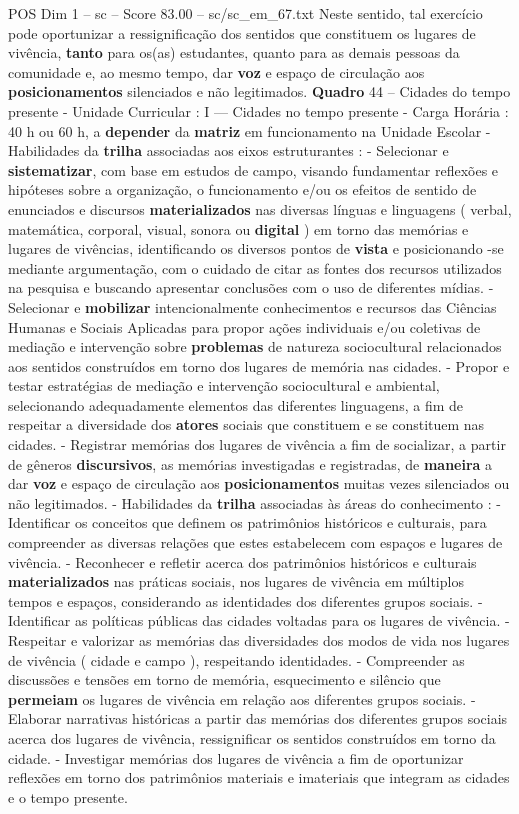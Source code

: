\begin{textsample}{POS Dim 1 – sc – Score 83.00 – sc/sc\_em\_67.txt}
Neste sentido, tal exercício pode oportunizar a ressignificação dos sentidos que constituem os lugares de vivência, \textbf{tanto} para os(as) estudantes, quanto para as demais pessoas da comunidade e, ao mesmo tempo, dar \textbf{voz} e espaço de circulação aos \textbf{posicionamentos} silenciados e não legitimados. \textbf{Quadro} 44 – Cidades do tempo presente - Unidade Curricular : I — Cidades no tempo presente - Carga Horária : 40 h ou 60 h, a \textbf{depender} da \textbf{matriz} em funcionamento na Unidade Escolar - Habilidades da \textbf{trilha} associadas aos eixos estruturantes : - Selecionar e \textbf{sistematizar}, com base em estudos de campo, visando fundamentar reflexões e hipóteses sobre a organização, o funcionamento e/ou os efeitos de sentido de enunciados e discursos \textbf{materializados} nas diversas línguas e linguagens ( verbal, matemática, corporal, visual, sonora ou \textbf{digital} ) em torno das memórias e lugares de vivências, identificando os diversos pontos de \textbf{vista} e posicionando -se mediante argumentação, com o cuidado de citar as fontes dos recursos utilizados na pesquisa e buscando apresentar conclusões com o uso de diferentes mídias. - Selecionar e \textbf{mobilizar} intencionalmente conhecimentos e recursos das Ciências Humanas e Sociais Aplicadas para propor ações individuais e/ou coletivas de mediação e intervenção sobre \textbf{problemas} de natureza sociocultural relacionados aos sentidos construídos em torno dos lugares de memória nas cidades. - Propor e testar estratégias de mediação e intervenção sociocultural e ambiental, selecionando adequadamente elementos das diferentes linguagens, a fim de respeitar a diversidade dos \textbf{atores} sociais que constituem e se constituem nas cidades. - Registrar memórias dos lugares de vivência a fim de socializar, a partir de gêneros \textbf{discursivos}, as memórias investigadas e registradas, de \textbf{maneira} a dar \textbf{voz} e espaço de circulação aos \textbf{posicionamentos} muitas vezes silenciados ou não legitimados. - Habilidades da \textbf{trilha} associadas às áreas do conhecimento : - Identificar os conceitos que definem os patrimônios históricos e culturais, para compreender as diversas relações que estes estabelecem com espaços e lugares de vivência. - Reconhecer e refletir acerca dos patrimônios históricos e culturais \textbf{materializados} nas práticas sociais, nos lugares de vivência em múltiplos tempos e espaços, considerando as identidades dos diferentes grupos sociais. - Identificar as políticas públicas das cidades voltadas para os lugares de vivência. - Respeitar e valorizar as memórias das diversidades dos modos de vida nos lugares de vivência ( cidade e campo ), respeitando identidades. - Compreender as discussões e tensões em torno de memória, esquecimento e silêncio que \textbf{permeiam} os lugares de vivência em relação aos diferentes grupos sociais. - Elaborar narrativas históricas a partir das memórias dos diferentes grupos sociais acerca dos lugares de vivência, ressignificar os sentidos construídos em torno da cidade. - Investigar memórias dos lugares de vivência a fim de oportunizar reflexões em torno dos patrimônios materiais e imateriais que integram as cidades e o tempo presente. 
\end{textsample}
